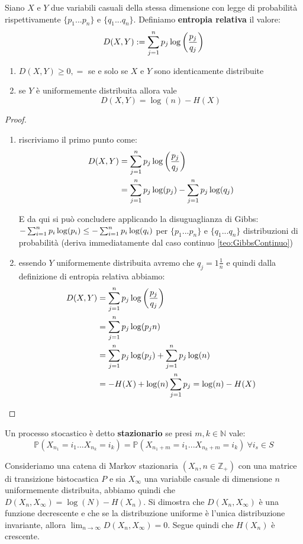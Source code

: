 \begin{defi}
Siano $X$ e $Y$ due variabili casuali della stessa dimensione con legge di probabilità rispettivamente $\{p_1...p_n \}$ e $\{q_1...q_n \}$.
Definiamo \textbf{entropia relativa} il valore:
\begin{equation}
D(X,Y):=\sum_{j=1}^n p_j \log \bigg( \frac{p_j}{q_j} \bigg)
\end{equation}
\end{defi}
\begin{teo}
\begin{enumerate}
Per l'entropia relativa vale:
\item $D(X,Y)\geq 0, =$ se e solo se $X$ e $Y$ sono identicamente distribuite
\item se $Y$ è uniformemente distribuita allora vale
\begin{equation}
D(X,Y)= \log(n)-H(X)
\end{equation}
\end{enumerate}
\end{teo}
\begin{proof}\leavevmode 
\begin{enumerate}
\item riscriviamo il primo punto come:
\[
\begin{split}
D(X,Y) & =\sum_{j=1}^n p_j \log \bigg( \frac{p_j}{q_j} \bigg)\\
& =\sum_{j=1}^n p_j \log (p_j) -\sum_{j=1}^n p_j \log (q_j)
\end{split}
\]

E da qui si può concludere applicando la disuguaglianza di Gibbs: $- \sum_{i=1}^n p_i \log(p_i) \leq - \sum_{i=1}^n p_i \log(q_i)$ per $\{p_1...p_n \}$ e $\{q_1...q_n \}$ distribuzioni di probabilità (deriva immediatamente dal caso continuo \ref{teo:GibbsContinuo})
\item essendo $Y$ uniformemente distribuita avremo che $q_j=1\frac{1}{n}$ e quindi dalla definizione di entropia relativa abbiamo:
\[
\begin{split}
D(X,Y) & =\sum_{j=1}^n p_j \log \bigg( \frac{p_j}{q_j} \bigg) \\
& =\sum_{j=1}^n p_j \log ( p_j n) \\
& =\sum_{j=1}^n p_j \log (p_j) + \sum_{j=1}^n p_j \log (n) \\
& =-H(X)+ \log(n) \sum_{j=1}^n p_j= \log(n)-H(X)
\end{split}
\]

\end{enumerate}
\end{proof}
\begin{defi}
Un processo stocastico è detto \textbf{stazionario} se presi $m,k\in \mathbb{N}$ vale:
$$\mathbb{P}(X_{n_1}=i_1...X_{n_k}=i_k)= \mathbb{P}(X_{n_1+m}=i_1...X_{n_k+m}=i_k) \ \forall i_s \in S$$
\end{defi}
Consideriamo una catena di Markov stazionaria $(X_n,n \in \mathbb{Z}_+)$ con una matrice di transizione bistocastica $P$ e sia $X_{\infty}$ una variabile casuale di dimensione $n$ uniformemente distribuita, abbiamo quindi che $D(X_n,X_{\infty})=\log(N)-H(X_n)$. Si dimostra che $D(X_n,X_{\infty})$ è una funzione decrescente e che se la distribuzione uniforme è l'unica distribuzione invariante, allora $\lim_{n \to \infty}D(X_n,X_{\infty})=0$. Segue quindi che $H(X_n)$ è crescente. \cite{Thomas}


